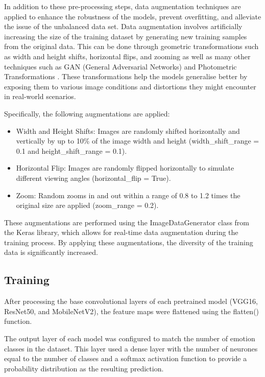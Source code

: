 In addition to these pre-processing steps, data augmentation techniques are applied to enhance the robustness of the models, prevent overfitting, and alleviate the issue of the unbalanced data set. Data augmentation involves artificially increasing the size of the training dataset by generating new training samples from the original data. This can be done through geometric transformations such as width and height shifts, horizontal flips, and zooming as well as many other techniques such as GAN (General Adversarial Networks) and Photometric Transformations \cite{Shorten2019-mj}. These transformations help the models generalise better by exposing them to various image conditions and distortions they might encounter in real-world scenarios.

Specifically, the following augmentations are applied:

\begin{itemize}
\item{} Width and Height Shifts: Images are randomly shifted horizontally and vertically by up to 10\% of the image width and height (width\_shift\_range = 0.1 and height\_shift\_range = 0.1).
\item{} Horizontal Flip: Images are randomly flipped horizontally to simulate different viewing angles (horizontal\_flip = True).
\item{} Zoom: Random zooms in and out within a range of 0.8 to 1.2 times the original size are applied (zoom\_range = 0.2).
\end{itemize}

These augmentations are performed using the ImageDataGenerator class from the Keras library, which allows for real-time data augmentation during the training process. By applying these augmentations, the diversity of the training data is significantly increased.

\subsection{Training}

After processing the base convolutional layers of each pretrained model (VGG16, ResNet50, and MobileNetV2), the feature maps were flattened using the flatten() function.

The output layer of each model was configured to match the number of emotion classes in the dataset. This layer used a dense layer with the number of neurones equal to the number of classes and a softmax activation function to provide a probability distribution as the resulting prediction.

